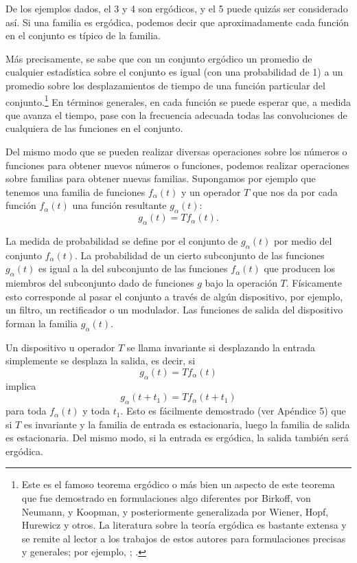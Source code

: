 De los ejemplos dados, el 3 y 4 son erg\'odicos, y el 5 puede quiz\'as
ser considerado as\'i. Si una familia es erg\'odica, podemos decir que
aproximadamente cada funci\'on en el conjunto es t\'ipico de la
familia.

M\'as precisamente, se sabe que con un conjunto erg\'odico un promedio
de cualquier estad\'istica sobre el conjunto es igual (con una
probabilidad de 1) a un promedio sobre los desplazamientos de tiempo
de una funci\'on particular del conjunto.\footnote{Este es el famoso
  teorema erg\'odico o m\'as bien un aspecto de este teorema que fue
  demostrado en formulaciones algo diferentes por Birkoff, von
  Neumann, y Koopman, y posteriormente generalizada por Wiener, Hopf,
  Hurewicz y otros. La literatura sobre la teor\'ia erg\'odica es
  bastante extensa y se remite al lector a los trabajos de estos
  autores para formulaciones precisas y generales; por ejemplo,
  \citet{hopf1,hopf2}; \citet{wiener}.}  En t\'erminos generales, en
cada funci\'on se puede esperar que, a medida que avanza el tiempo,
pase con la frecuencia adecuada todas las convoluciones de cualquiera
de las funciones en el conjunto.

Del mismo modo que se pueden realizar diversas operaciones sobre los
n\'umeros o funciones para obtener nuevos n\'umeros o funciones,
podemos realizar operaciones sobre familias para obtener nuevas
familias. Supongamos por ejemplo que tenemos una familia de funciones
$f_{\alpha}(t)$ y un operador $T$ que nos da por cada funci\'on
$f_{\alpha}(t)$ una funci\'on resultante $g_{\alpha}(t)$:
\begin{equation}
  g_{\alpha}(t) = Tf_{\alpha}(t).
\end{equation}

La medida de probabilidad se define por el conjunto de $g_{\alpha}(t)$
por medio del conjunto $f_{\alpha}(t)$. La probabilidad de un cierto
subconjunto de las funciones $g_{\alpha}(t)$ es igual a la del
subconjunto de las funciones $f_{\alpha}(t)$ que producen los miembros
del subconjunto dado de funciones $g$ bajo la operaci\'on
$T$. F\'isicamente esto corresponde al pasar el conjunto a trav\'es de
alg\'un dispositivo, por ejemplo, un filtro, un rectificador o un
modulador. Las funciones de salida del dispositivo forman la familia
$g_{\alpha}(t)$.

Un dispositivo u operador $T$ se llama invariante si desplazando la
entrada simplemente se desplaza la salida, es decir, si
\begin{equation}
  g_{\alpha}(t) = Tf_{\alpha}(t)
\end{equation}
implica
\begin{equation}
  g_{\alpha}(t+t_1) = Tf_{\alpha}(t+t_1)
\end{equation}
para toda $f_{\alpha}(t)$ y toda $t_1$. Esto es f\'acilmente
demostrado (ver Ap\'endice 5) que si $T$ es invariante y la familia de
entrada es estacionaria, luego la familia de salida es
estacionaria. Del mismo modo, si la entrada es erg\'odica, la salida
tambi\'en ser\'a erg\'odica.


